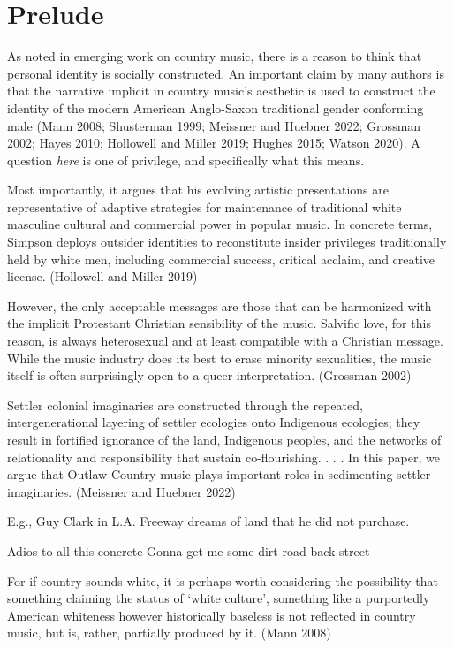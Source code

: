 \documentclass[
  letterpaper,
  DIV=11,
  numbers=noendperiod]{scrartcl}
\theoremstyle{remark}
\begin{document}
\newpage

\section{Prelude}\label{prelude}

As noted in emerging work on country music, there is a reason to think
that personal identity is socially constructed. An important claim by
many authors is that the narrative implicit in country music's aesthetic
is used to construct the identity of the modern American Anglo-Saxon
traditional gender conforming male (Mann 2008; Shusterman 1999; Meissner
and Huebner 2022; Grossman 2002; Hayes 2010; Hollowell and Miller 2019;
Hughes 2015; Watson 2020). A question \emph{here} is one of privilege,
and specifically what this means.

Most importantly, it argues that his evolving artistic presentations are
representative of adaptive strategies for maintenance of traditional
white masculine cultural and commercial power in popular music. In
concrete terms, Simpson deploys outsider identities to reconstitute
insider privileges traditionally held by white men, including commercial
success, critical acclaim, and creative license. (Hollowell and Miller
2019)

However, the only acceptable messages are those that can be harmonized
with the implicit Protestant Christian sensibility of the music.
Salvific love, for this reason, is always heterosexual and at least
compatible with a Christian message. While the music industry does its
best to erase minority sexualities, the music itself is often
surprisingly open to a queer interpretation. (Grossman 2002)

Settler colonial imaginaries are constructed through the repeated,
intergenerational layering of settler ecologies onto Indigenous
ecologies; they result in fortified ignorance of the land, Indigenous
peoples, and the networks of relationality and responsibility that
sustain co-flourishing. . . . In this paper, we argue that Outlaw
Country music plays important roles in sedimenting settler imaginaries.
(Meissner and Huebner 2022)

E.g., Guy Clark in L.A. Freeway dreams of land that he did not purchase.

Adios to all this concrete Gonna get me some dirt road back street

For if country sounds white, it is perhaps worth considering the
possibility that something claiming the status of `white culture',
something like a purportedly American whiteness however historically
baseless is not reflected in country music, but is, rather, partially
produced by it. (Mann 2008)
\end{document}
